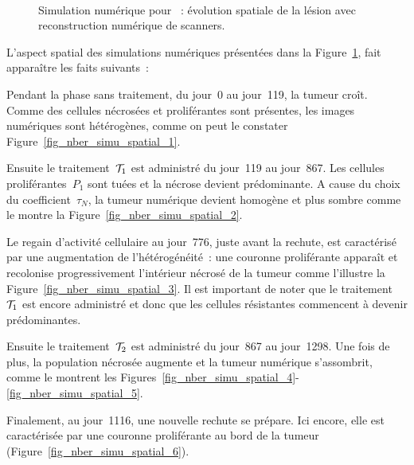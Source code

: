 \documentclass[main.tex]{subfiles}
\begin{document}
\begin{figure}[h]
\\
\caption{Simulation numérique pour \Nber~: évolution spatiale de la lésion avec reconstruction numérique de scanners.} \label{fig:simu_henbert_scan}
\end{figure}


L'aspect spatial des simulations numériques présentées dans la Figure~\ref{fig:simu_henbert_scan}, fait apparaître les faits suivants~:
\begin{myenumerate}[label=\roman*)]
\item \label{ini} Pendant la phase sans traitement, du jour~0
    au jour~119, la tumeur croît. Comme des cellules nécrosées et proliférantes sont présentes, les images numériques sont hétérogènes, comme on peut le constater Figure~\ref{fig_nber_simu_spatial_1}.
\item \label{TI} Ensuite le traitement~${\mathcal T_1}$ est administré du jour~119 au jour~867.
 Les cellules proliférantes~$P_1$ sont tuées et la nécrose devient prédominante. A cause du choix du coefficient~$\tau_N$, la tumeur numérique devient homogène et plus sombre comme le montre la Figure~\ref{fig_nber_simu_spatial_2}.
\item \label{failureTI} Le regain d'activité cellulaire au jour~776, juste avant la rechute, est caractérisé par une augmentation de l'hétérogénéité~: une couronne proliférante apparaît et recolonise progressivement l'intérieur nécrosé de la tumeur comme l'illustre la  Figure~\ref{fig_nber_simu_spatial_3}. Il est important de noter que le traitement~${\mathcal T_1}$ est encore administré et donc que les cellules résistantes commencent à devenir prédominantes.
\item \label{TS} Ensuite le traitement~${\mathcal T_2}$ est administré du jour~867 au jour~1298. Une fois de plus, la population nécrosée augmente et la tumeur numérique s'assombrit, comme le montrent les Figures~\ref{fig_nber_simu_spatial_4}-\ref{fig_nber_simu_spatial_5}.
\item \label{last} Finalement, au jour~1116, une nouvelle rechute se prépare. Ici encore, elle est caractérisée par une couronne proliférante au bord de la tumeur (\cf  Figure~\ref{fig_nber_simu_spatial_6}).
\end{myenumerate}
\end{document}
